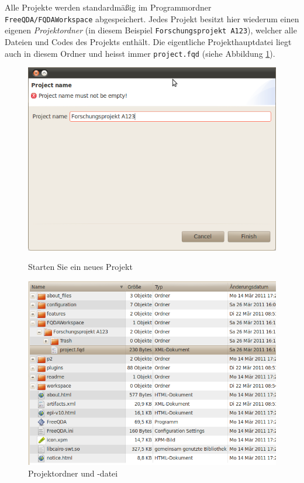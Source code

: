 Alle Projekte werden standardmäßig im Programmordner \texttt{FreeQDA/FQDAWorkspace} ab\-ge\-speichert. %
Jedes Projekt besitzt hier wiederum einen eigenen \textit{Projektordner} (in diesem Beispiel \texttt{Forschungs\-projekt A123}), welcher alle Dateien und Codes %
des Projekts enthält. Die eigentliche Projekt\-hauptdatei liegt auch in diesem Ordner und heisst immer \texttt{project.fqd} (siehe %
Abbildung \ref{fig:projektdatei}).
% 
\begin{figure}[!hbt]
\begin{minipage}[!hb!]{0.5\textwidth}
	\centering
	 \includegraphics[width=\textwidth]{img/NewProject}
	\caption{Starten Sie ein neues Projekt}
	\label{fig:newproject}
\end{minipage}
\hfill
\begin{minipage}[!hb!]{0.5\textwidth}
	\centering
	 \includegraphics[width=\textwidth]{img/ProjektFile}
	\caption{Projektordner und -datei}
	\label{fig:projektdatei}
\end{minipage}
\end{figure}


